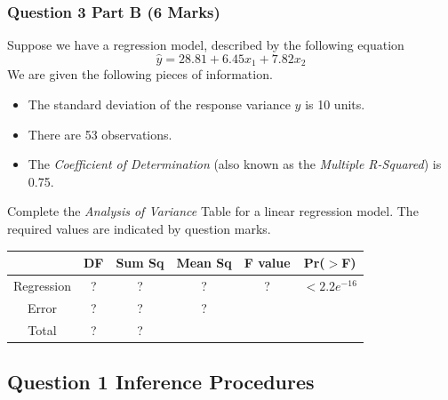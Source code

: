 \documentclass[a4paper,12pt]{article}
\begin{document}
\newpage
\subsubsection*{Question 3 Part B (6 Marks)}
Suppose we have a regression model, described by the following equation
\[ \hat{y} = 28.81 + 6.45x_1 + 7.82 x_2\]
We are given the following pieces of information.
\begin{itemize}
	\item The standard deviation of the response variance $y$ is 10 units.
	\item There are 53 observations.
	\item The \textit{Coefficient of Determination} (also known as the \textit{Multiple R-Squared}) is 0.75.
\end{itemize}
Complete the \textit{Analysis of Variance} Table for a linear regression model.
The required values are indicated by question marks.

\begin{center}
	\begin{tabular}{|c|c|c|c|c|c|} \hline
		\phantom{makespace}	& DF & 	Sum Sq &	Mean Sq &	F value &   	Pr($>$F)    \\ \hline
		Regression &  \phantom{make}?\phantom{make} &	? &	? &	 ? &	$< 2.2e^{-16}$ \\ \hline
		Error  & ? &	? &  	?   &            &       \\ \hline
		Total  & ?  &	? &  \phantom{makespace}	  &   \phantom{makespace}         &    \phantom{makespace}    \\ \hline
	\end{tabular} 
\end{center}
	\subsection*{Question 1 Inference Procedures}
	
\end{document}
